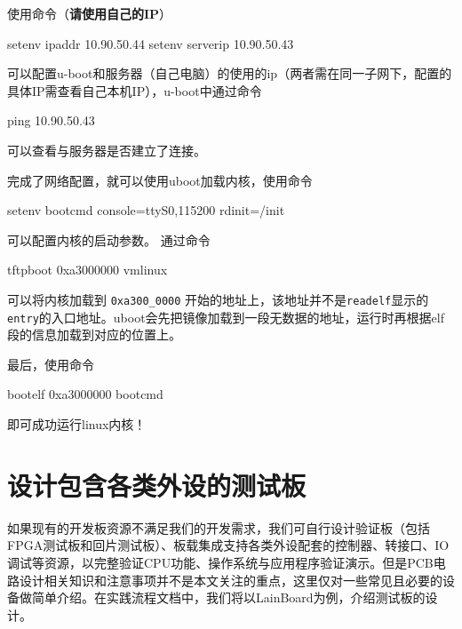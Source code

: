 使用命令（\textbf{请使用自己的IP}）

\begin{CodeBlock}[language=BookShell]
setenv ipaddr 10.90.50.44
setenv serverip 10.90.50.43
\end{CodeBlock}

可以配置u-boot和服务器（自己电脑）的使用的ip（两者需在同一子网下，配置的具体IP需查看自己本机IP），u-boot中通过命令

\begin{CodeBlock}[language=BookShell]
ping 10.90.50.43
\end{CodeBlock}

可以查看与服务器是否建立了连接。

完成了网络配置，就可以使用uboot加载内核，使用命令

\begin{CodeBlock}[language=BookShell]
setenv bootcmd console=ttyS0,115200 rdinit=/init
\end{CodeBlock}

可以配置内核的启动参数。 通过命令

\begin{CodeBlock}[language=BookShell]
tftpboot 0xa3000000 vmlinux
\end{CodeBlock}

可以将内核加载到 \texttt{0xa300\_0000} 开始的地址上，该地址并不是\texttt{readelf}显示的\texttt{entry}的入口地址。uboot会先把镜像加载到一段无数据的地址，运行时再根据elf段的信息加载到对应的位置上。

最后，使用命令

\begin{CodeBlock}[language=BookShell]
bootelf 0xa3000000 bootcmd
\end{CodeBlock}

即可成功运行linux内核！

\section{设计包含各类外设的测试板}\label{sec:12-fpga-verification-005}

如果现有的开发板资源不满足我们的开发需求，我们可自行设计验证板（包括FPGA测试板和回片测试板）、板载集成支持各类外设配套的控制器、转接口、IO调试等资源，以完整验证CPU功能、操作系统与应用程序验证演示。但是PCB电路设计相关知识和注意事项并不是本文关注的重点，这里仅对一些常见且必要的设备做简单介绍。在实践流程文档中，我们将以LainBoard为例，介绍测试板的设计。

